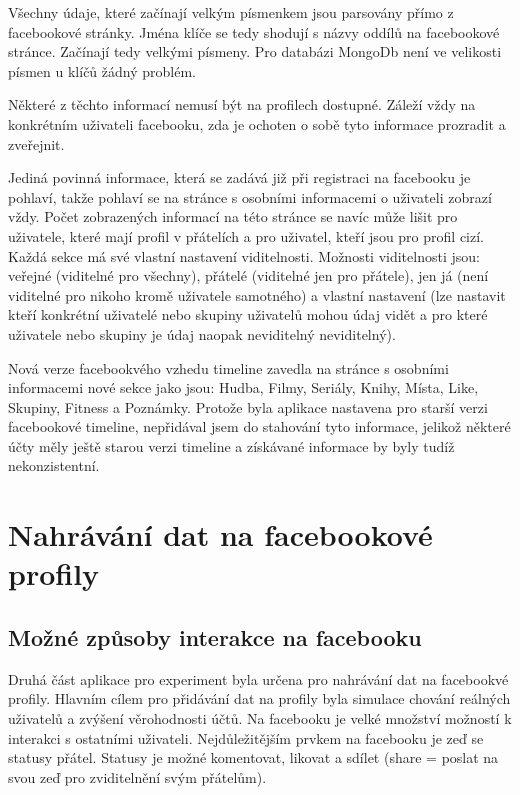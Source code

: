 \documentclass[thesis=M,czech]{FITthesis}[2013/05/10]
\begin{document}
Všechny údaje, které začínají velkým písmenkem jsou parsovány přímo z facebookové stránky. Jména klíče se tedy shodují s názvy oddílů na facebookové stránce. Začínají tedy velkými písmeny. Pro databázi MongoDb není ve velikosti písmen u klíčů žádný problém.

Některé z těchto informací nemusí být na profilech dostupné. Záleží vždy na konkrétním uživateli facebooku, zda je ochoten o sobě tyto informace prozradit a zveřejnit.

Jediná povinná informace, která se zadává již při registraci na facebooku je pohlaví, takže pohlaví se na stránce s osobními informacemi o uživateli zobrazí vždy. Počet zobrazených informací na této stránce se navíc může lišit pro uživatele, které mají profil v přátelích a pro uživatel, kteří jsou pro profil cizí. Každá sekce má své vlastní nastavení viditelnosti. Možnosti viditelnosti jsou: veřejné (viditelné pro všechny), přátelé (viditelné jen pro přátele), jen já (není viditelné pro nikoho kromě uživatele samotného) a vlastní nastavení (lze nastavit kteří konkrétní uživatelé nebo skupiny uživatelů mohou údaj vidět a pro které uživatele nebo skupiny je údaj naopak neviditelný neviditelný).

Nová verze facebookvého vzhedu timeline zavedla na stránce s osobními informacemi nové sekce jako jsou: Hudba, Filmy, Seriály, Knihy, Místa, Like, Skupiny, Fitness a Poznámky. Protože byla aplikace nastavena pro starší verzi facebookové timeline, nepřidával jsem do stahování tyto informace, jelikož některé účty měly ještě starou verzi timeline a získávané informace by byly tudíž nekonzistentní.

\section{Nahrávání dat na facebookové profily}

\subsection{Možné způsoby interakce na facebooku}

Druhá část aplikace pro experiment byla určena pro nahrávání dat na facebookvé profily. Hlavním cílem pro přidávání dat na profily byla simulace chování reálných uživatelů a zvýšení věrohodnosti účtů. Na facebooku je velké množství možností k interakci s ostatními uživateli. Nejdůležitějším prvkem na facebooku je zeď se statusy přátel. Statusy je možné komentovat, likovat a sdílet (share = poslat na svou zeď pro zviditelnění svým přátelům). 
\end{document}
